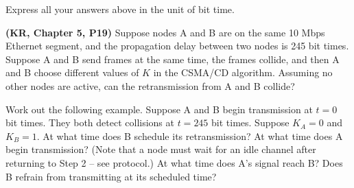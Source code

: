 \documentclass[a4paper,11pt,answers]{exam}
\begin{document}
\begin{questions}
	Express all your answers above in the unit of bit time.
	
	\begin{solution}
	
	\end{solution}

	\question \textbf{(KR, Chapter 5, P19)}
	Suppose nodes A and B are on the same 10 Mbps Ethernet
	segment, and the propagation delay between two nodes is 245
	bit times.  Suppose A and B send frames at the same time,
	the frames collide, and then A and B choose different values
	of $K$ in the CSMA/CD algorithm.  Assuming no other nodes
	are active, can the retransmission from A and B collide?

	Work out the following example.  Suppose A and B begin
	transmission at $t = 0$ bit times.  They both detect
	collisions at $t = 245$ bit times.  Suppose $K_A =
	0$ and $K_B = 1$.  At what time does B schedule its
	retransmission?  At what time does A begin transmission?
	(Note that a node must wait for an idle channel after
	returning to Step 2 -- see protocol.)  At what time does
	A's signal reach B? Does B refrain from transmitting at its
	scheduled time?
    \end{questions}
	\begin{solution}
		
	\end{solution}
\end{document}
